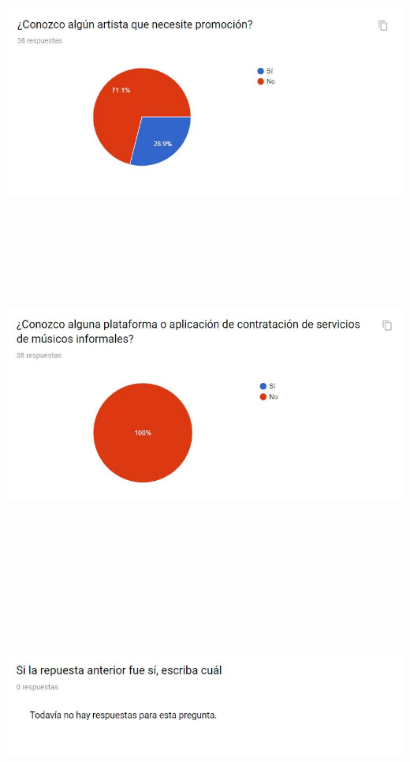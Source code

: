 \begin{center}
\includegraphics[width=16cm, height=10cm,keepaspectratio=true]{Desarrollo/RecoleccionInformacion/imgs/3.JPG}
\includegraphics[width=16cm, height=10cm,keepaspectratio=true]{Desarrollo/RecoleccionInformacion/imgs/4.JPG}
\includegraphics[width=16cm, height=10cm,keepaspectratio=true]{Desarrollo/RecoleccionInformacion/imgs/5.JPG}

\end{center}

